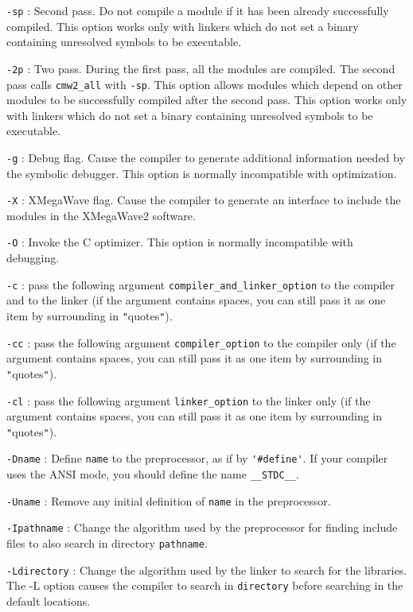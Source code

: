 \verb+-sp+ : Second pass. Do not compile a module if it has been already successfully compiled. This option works only with linkers which do not set a binary containing unresolved symbols to be executable.

\verb+-2p+ : Two pass. During the first pass, all the modules are compiled. 
The second pass calls \verb+cmw2_all+ with \verb+-sp+.
This option allows modules which depend on other modules to be successfully compiled after the second pass. This option works only with linkers which do not set a binary containing unresolved symbols to be executable.

\verb+-g+ : Debug flag. Cause the compiler to generate additional information
needed by the symbolic debugger.  This option is normally incompatible with optimization.

\verb+-X+ : XMegaWave flag. Cause the compiler to generate an interface to include the modules in the XMegaWave2 software.

\verb+-O+ : Invoke the C optimizer. This option is normally incompatible with debugging.

\verb+-c+ : pass the following argument \verb+compiler_and_linker_option+ to the compiler and to the linker
(if the argument contains spaces, you can still pass it as one item by surrounding in \verb+"+quotes\verb+"+).

\verb+-cc+ : pass the following argument \verb+compiler_option+ to the compiler only
(if the argument contains spaces, you can still pass it as one item by surrounding in \verb+"+quotes\verb+"+).

\verb+-cl+ : pass the following argument \verb+linker_option+ to the linker only
(if the argument contains spaces, you can still pass it as one item by surrounding in \verb+"+quotes\verb+"+).

\verb+-Dname+ : Define \verb+name+ to the preprocessor, as if by \verb+'#define'+.
If your compiler uses the ANSI mode, you should define the name  \verb+__STDC__+.

\verb+-Uname+ : Remove any initial definition of \verb+name+ in the preprocessor. 

\verb+-Ipathname+ : Change the algorithm used by the preprocessor for finding include files to also search in directory \verb+pathname+.

\verb+-Ldirectory+ :  Change the algorithm used by the linker to search for
the libraries.  The -L option causes the compiler to search in \verb+directory+ before searching in the default locations.

